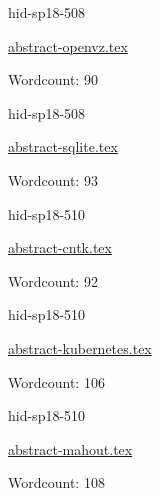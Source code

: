 

\begin{IU}

hid-sp18-508

\href{https://github.com/cloudmesh-community/hid-sp18-508/blob/master//technology/abstract-openvz.tex}{abstract-openvz.tex}

 

Wordcount: 90

\end{IU}



\begin{IU}

hid-sp18-508

\href{https://github.com/cloudmesh-community/hid-sp18-508/blob/master//technology/abstract-sqlite.tex}{abstract-sqlite.tex}

 

Wordcount: 93

\end{IU}



\begin{IU}

hid-sp18-510

\href{https://github.com/cloudmesh-community/hid-sp18-510/blob/master//technology/abstract-cntk.tex}{abstract-cntk.tex}

 

Wordcount: 92

\end{IU}



\begin{IU}

hid-sp18-510

\href{https://github.com/cloudmesh-community/hid-sp18-510/blob/master//technology/abstract-kubernetes.tex}{abstract-kubernetes.tex}

 

Wordcount: 106

\end{IU}



\begin{IU}

hid-sp18-510

\href{https://github.com/cloudmesh-community/hid-sp18-510/blob/master//technology/abstract-mahout.tex}{abstract-mahout.tex}

 

Wordcount: 108

\end{IU}

